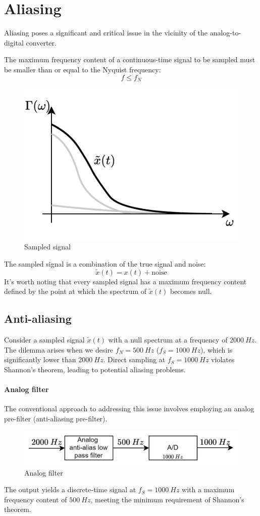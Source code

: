 \section{Aliasing}

Aliasing poses a significant and critical issue in the vicinity of the analog-to-digital converter.
\begin{theorem}[Shannon]
    The maximum frequency content of a continuous-time signal to be sampled must be smaller than or equal to the Nyquist frequency:
    \[f\leq f_N\]
\end{theorem}
\begin{figure}[H]
    \centering
    \includegraphics[width=0.4\linewidth]{images/noise.png}
    \caption{Sampled signal}
\end{figure}
The sampled signal is a combination of the true signal and noise:
\[\tilde{x}(t)=x(t)+\text{noise}\]
It's worth noting that every sampled signal has a maximum frequency content defined by the point at which the spectrum of $\tilde{x}(t)$ becomes null.

\subsection{Anti-aliasing}
Consider a sampled signal $\tilde{x}(t)$  with a null spectrum at a frequency of $2000\:Hz$. 
The dilemma arises when we desire $f_N=500\:Hz$ ($f_S=1000\:Hz$), which is significantly lower than  $2000\:Hz$. 
Direct sampling at $f_S=1000\:Hz$ violates Shannon's theorem, leading to potential aliasing problems.

\paragraph*{Analog filter}
The conventional approach to addressing this issue involves employing an analog pre-filter (anti-aliasing pre-filter).
\begin{figure}[H]
    \centering
    \includegraphics[width=0.7\linewidth]{images/alias.png}
    \caption{Analog filter}
\end{figure}
The output yields a discrete-time signal at $f_S=1000\:Hz$ with a maximum frequency content of $500\:Hz$, meeting the minimum requirement of Shannon's theorem.

